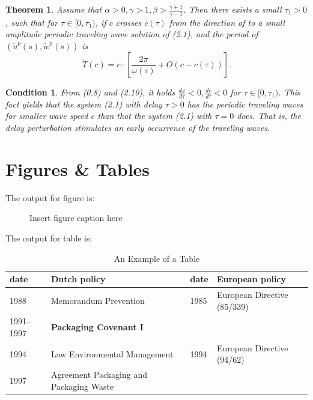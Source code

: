 \documentclass[openacc]{rsproca_new}%
\newtheorem{theorem}{\bf Theorem}[section]
\newtheorem{condition}{\bf Condition}[section]
\begin{document}
\begin{theorem}\label{T0.1}
Assume that $\alpha>0, \gamma>1, \beta>\frac{\gamma+1}{\gamma-1}$.
Then there exists a small $\tau_1>0$, such that for $\tau\in
[0,\tau_1)$, if $c$ crosses $c(\tau)$ from the direction of
to  a small amplitude periodic traveling wave solution of
(2.1), and the period of $(\check{u}^p(s),\check{w}^p(s))$ is
\[
\check{T}(c)=c\cdot \left[\frac{2\pi}{\omega(\tau)}+O(c-c(\tau))\right].
\]
\end{theorem}


\begin{condition}\label{C2.2}
From (0.8) and (2.10), it holds
$\frac{d\omega}{d\tau}<0,\frac{dc}{d\tau}<0$ for $\tau\in
[0,\tau_1)$. This fact yields that the system (2.1) with delay
$\tau>0$ has the periodic traveling waves for smaller wave speed $c$
than that the system (2.1) with $\tau=0$ does. That is, the
delay perturbation stimulates an early occurrence of the traveling waves.
\end{condition}


\section{Figures \& Tables}

The output for figure is:\vspace*{-7pt}

\begin{figure}[!h]
\caption{Insert figure caption here}
\label{fig_sim}
\end{figure}

\vspace*{-5pt}

\noindent The output for table is:\vspace*{-7pt}

\begin{table}[!h]
\caption{An Example of a Table}%
\label{table_example}
\begin{tabular}{llll}%
\hline
date &Dutch policy &date &European policy \\
\hline
1988 &Memorandum Prevention &1985 &European Directive (85/339) \\
1991--1997 &{\bf Packaging Covenant I} & & \\
1994 &Law Environmental Management &1994 &European Directive (94/62) \\
1997 &Agreement Packaging and Packaging Waste & & \\\hline
\end{tabular}
\vspace*{-4pt}
\end{table}%
\end{document}
